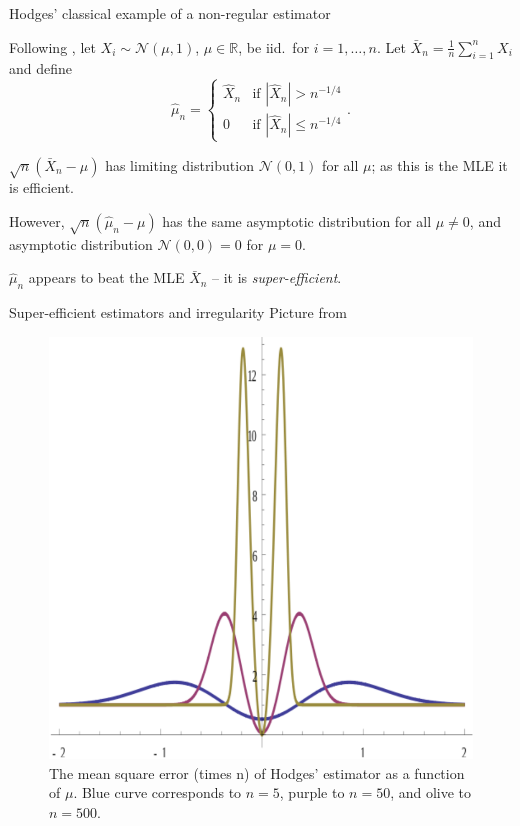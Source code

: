 \documentclass[smaller]{beamer}\usepackage{listings}
\newcommand{\R}{\mathbb{R}}
\newcommand{\1}{\mathds{1}}
\begin{document}
\begin{frame}[label={sec:orgb792d28}]{Hodges' classical example of a non-regular estimator}

Following \cite[][chapter~3.1]{tsiatis2007semiparametric}, let
\( X_i \sim \mathcal{N}(\mu, 1) \), $\mu \in \R$, be iid.\ for
\( i=1, \dots, n \). Let \( \bar{X}_n = \frac{1}{n}\sum_{i=1}^{n}X_i \) and
define
\begin{equation*}
  \hat{\mu}_n = 
    \begin{cases}
      \hat{X}_n & \text{if } |\hat{X}_n| > n^{-1/4} \\
      0 & \text{if } |\hat{X}_n| \leq n^{-1/4}
    \end{cases}.
\end{equation*}
\vfill

\( \sqrt{n}(\bar{X}_n-\mu) \) has limiting distribution \( \mathcal{N}(0,1) \) for all
$\mu$; as this is the MLE it is efficient.

\vfill

However, $\sqrt{n}(\hat{\mu}_n-\mu)$ has the same asymptotic distribution for
all $\mu \not = 0$, and asymptotic distribution \( \mathcal{N}(0,0) = 0 \) for
$\mu=0$.

\vfill

$\hat{\mu}_n$ appears to beat the MLE \( \bar{X}_n \) -- it is
\textit{super-efficient}.
\end{frame}

\begin{frame}[label={sec:orgb15cf5d}]{Super-efficient estimators and irregularity}
Picture from \cite{wiki:Hodges'_estimator}

\begin{figure}[htbp]
\centering
\includegraphics[width=.5\textwidth]{./Hodges-estimator-risk-function.png}
\caption{The mean square error (times n) of Hodges' estimator as a function of \(\mu\). Blue curve corresponds to \(n = 5\), purple to \(n = 50\), and olive to \(n = 500\).}
\end{figure}
\end{frame}
\end{document}
